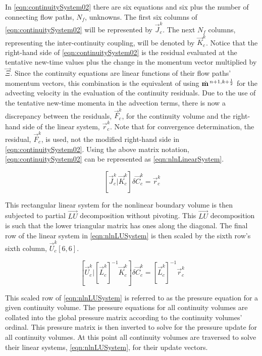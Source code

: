 In \eqref{eqn:continuitySystem02} there are six equations and six plus the number of connecting flow paths, $N_{f}$, unknowns.
The first six columns of \eqref{eqn:continuitySystem02} will be represented by $\vec{J}^{k}_{c}$.
The next $N_{f}$ columns, representing the inter-continuity coupling, will be denoted  by $\vec{K}^{k}_{c}$.
Notice that the right-hand side of \eqref{eqn:continuitySystem02} is the residual evaluated at the tentative new-time values plus the change in the momentum vector multiplied by $\vec{\Xi}$.
Since the continuity equations are linear functions of their flow paths' momentum vectors, this combination is the equivalent of using $\momVec{}^{n+1, k + \onehalf}$ for the advecting velocity in the evaluation of the continuity residuals.
Due to the use of the tentative new-time momenta in the advection terms, there is now a discrepancy between the residuals, $\vec{F}^{k}_{c}$, for the continuity volume and the right-hand side of the linear system, $\vec{r}^{k}_{c}$.
Note that for convergence determination, the residual, $\vec{F}^{k}_{c}$, is used, not the modified right-hand side in \eqref{eqn:continuitySystem02}.
Using the above matrix notation, \eqref{eqn:continuitySystem02} can be represented as \eqref{eqn:nlnLinearSystem}.

\begin{equation}
\label{eqn:nlnLinearSystem}
\left[ \vec{J}^{k}_{c} \vert \vec{K}^{k}_{c} \right] \delta \vec{C}_{c}^{k} = \vec{r}^{k}_{c}
\end{equation}

This rectangular linear system for the nonlinear boundary volume is then subjected to partial $\vec{LU}$ decomposition without pivoting.
This $\vec{LU}$ decomposition is such that the lower triangular matrix has ones along the diagonal.
The final row of the linear system in \eqref{eqn:nlnLUSystem} is then scaled by the sixth row's sixth column, $\vec{U}^{k}_{c}[6,6]$.

\begin{equation}
\label{eqn:nlnLUSystem}
\left[ \vec{U}^{k}_{c} \vert \left[\vec{L}^{k}_{c}\right]^{-1}\vec{K}^{k}_{c} \right] \delta \vec{C}^{k}_{c} = \left[\vec{L}^{k}_{c}\right]^{-1}\vec{r}^{k}_{c}
\end{equation}

This scaled row of \eqref{eqn:nlnLUSystem} is referred to as the pressure equation for a given continuity volume.
The pressure equations for all continuity volumes are collated into the global pressure matrix according to the continuity volumes' ordinal.
This pressure matrix is then inverted to solve for the pressure update for all continuity volumes.
At this point all continuity volumes are traversed to solve their linear systems, \eqref{eqn:nlnLUSystem}, for their update vectors.

